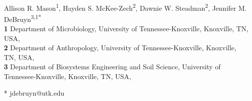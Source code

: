 \documentclass[
  10pt,
  letterpaper,
]{article}
\begin{document}
\vspace*{0.2in}

\begin{flushleft}
{\Large
\textbf{} %
}
\newline
\\
Allison R. Mason\textsuperscript{1}, Hayden S.
McKee-Zech\textsuperscript{2}, Dawnie W.
Steadman\textsuperscript{2}, Jennifer M. DeBruyn\textsuperscript{3,1*}
\\
\bigskip
\textbf{1} Department of Microbiology, University of
Tennessee-Knoxville, Knoxville, TN, USA, \\ \textbf{2} Department of
Anthropology, University of
Tennessee-Knoxville, Knoxville, TN, USA, \\ \textbf{3} Department of
Biosystems Engineering and Soil Science, University of
Tennessee-Knoxville, Knoxville, TN, USA, 
\bigskip

% 
%





* jdebruyn@utk.edu

\end{flushleft}
\end{document}
